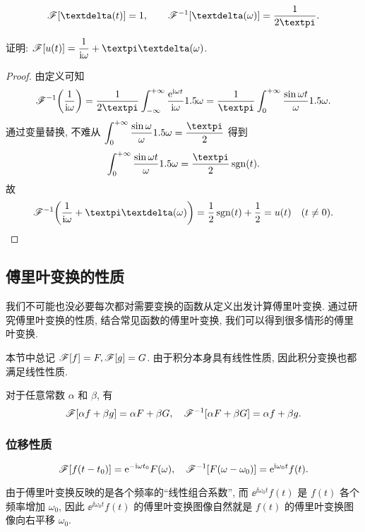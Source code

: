\begin{theorem}
  \[
    \msf[\dirac(t)]=1,\qquad
    \msf^{-1}[\dirac(\omega)]=\dfrac1{2\cpi}.
  \]
\end{theorem}

\begin{example}\label{exam:fourier-transform-ut}
  证明: $\msf[u(t)]=\dfrac1{\ii \omega}+\cpi\dirac(\omega)$.
\end{example}

\begin{proof}
  由定义可知
  \[
    \msf^{-1}\biggl(\frac1{\ii \omega}\biggr)
    =\frac1{2\cpi}\intff \frac{\ee^{\ii \omega t}}{\ii \omega} \d\omega
    =\frac1\cpi\intf\frac{\sin\omega t}{\omega} \d\omega.
  \]
  通过变量替换, 不难从 $\intf\frac{\sin\omega}\omega \d\omega=\dfrac\cpi2$ 得到
  \[
    \intf\frac{\sin\omega t}\omega \d\omega=\frac\cpi2\sgn(t).
  \]
  故
  \[
    \msf^{-1} \biggl(\frac1{\ii \omega}+\cpi\dirac(\omega)\biggr)
    =\half\sgn(t)+\half =u(t)\quad (t\neq 0).\qedhere
  \]
\end{proof}


\subsection{傅里叶变换的性质}

我们不可能也没必要每次都对需要变换的函数从定义出发计算傅里叶变换. 
通过研究傅里叶变换的性质, 结合常见函数的傅里叶变换, 我们可以得到很多情形的傅里叶变换.

本节中总记 $\mathscr{F}[f]=F,\mathscr{F}[g]=G$.
由于积分本身具有线性性质, 因此积分变换也都满足线性性质.

\begin{theorem}[线性性质]
  对于任意常数 $\alpha$ 和 $\beta$, 有
  \[
    \mathscr{F}[\alpha f+\beta g]=\alpha F+\beta G,\quad
    \mathscr{F}^{-1}[\alpha F+\beta G]=\alpha f+\beta g.
  \]
\end{theorem}


\subsubsection{位移性质}

\begin{theorem}[位移性质]
  \[\mathscr{F}[f(t-t_0)]=\mathrm{e}^{-\mathrm{i} \omega t_0}F(\omega),\quad
  \mathscr{F}^{-1}[F(\omega-\omega_0)]=\mathrm{e}^{\mathrm{i} \omega_0 t}f(t).\]
\end{theorem}

由于傅里叶变换反映的是各个频率的``线性组合系数'', 而 $\ee^{\ii \omega_0 t}f(t)$ 是 $f(t)$ 各个频率增加 $\omega_0$, 因此 $\ee^{\ii \omega_0 t}f(t)$ 的傅里叶变换图像自然就是 $f(t)$ 的傅里叶变换图像向右平移 $\omega_0$.

